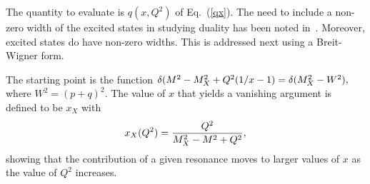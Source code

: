 \documentclass[aps,prd,amsmath,longbibliography]{revtex4-1}
\newcommand{\eq}[1]{Eq.~(\ref{#1})}
\def\bea{\begin{eqnarray}}
\def\eea{\end{eqnarray}}\def\a{\alpha}\newcommand{\bfk}{{\bf k}}\newcommand{\bfq}{{\bf q}}
\begin{document}
{The quantity to evaluate is $q(x,Q^2)$ of \eq{qx}.  The need to include a non-zero width of the excited states in studying duality  has been noted  in~\cite{Isgur:2001bt,Jeschonnek:2003sb}.  Moreover, excited states do have non-zero widths. This is addressed next using a Breit-Wigner form.
 






The starting point is the function $\delta(M^2-M_X^2+Q^2(1/x-1) =\delta(M_X^2 -W^2),$ where $W^2=(p+q)^2$.
The value of $x$ that yields a vanishing argument is defined to be $x_X$ with
\bea x_X(Q^2)={Q^2\over M_X^2-M^2+ Q^2},\label{xx}\eea
showing that the contribution of a given resonance moves to larger values of $x$ as the value of $Q^2$ increases.


}
\end{document}
